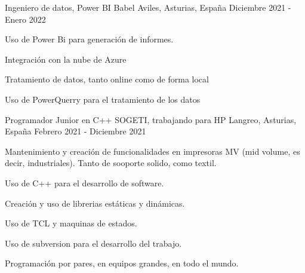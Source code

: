 

\begin{cventries}

    \cventry
    {Ingeniero de datos, Power BI} %
    {Babel} %
    {Aviles, Asturias, España} %
    {Diciembre 2021 - Enero 2022} %
    {
        \begin{cvitems} %
            \item {Uso de Power Bi para generación de informes.}
            \item  {Integración con la nube de Azure}
            \item {Tratamiento de datos, tanto online como de forma local}
            \item {Uso de PowerQuerry para el tratamiento de los datos}
        \end{cvitems}
    }

    \cventry
    {Programador Junior en C++} %
    {SOGETI, trabajando para HP} %
    {Langreo, Asturias, España} %
    {Febrero 2021 - Diciembre 2021} %
    {
        \begin{cvitems} %
            \item {Mantenimiento y creación de funcionalidades en impresoras MV (mid volume, es decir, industriales).
                        Tanto de sooporte solido, como textil.}
            \item {Uso de C++ para el desarrollo de software.}
            \item {Creación y uso de librerias estáticas y dinámicas.}
            \item {Uso de TCL y maquinas de estados.}
            \item {Uso de subversion para el desarrollo del trabajo.}
            \item {Programación por pares, en equipos grandes, en todo el mundo.}
        \end{cvitems}
    }


\end{cventries}
